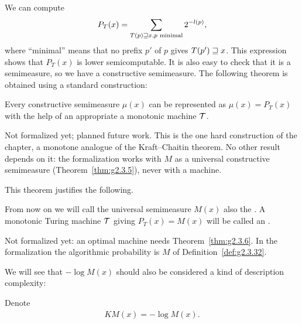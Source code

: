 We can compute
 \begin{align*}
  P_{T}(x)=\sum_{T(p) \sqsupseteq x, p\text{ minimal}} 2^{-l(p)},
 \end{align*}
where ``minimal'' means that no prefix \( p' \) of \( p \) gives \( T(p')\sqsupseteq x \).
This expression shows that \( P_{T}(x) \) is lower semicomputable.
It is also easy to check that it is a semimeasure, so we have a constructive
semimeasure.
The following theorem is obtained using a standard construction:

\begin{theorem}
  \label{thm:g2.3.6}
Every constructive semimeasure \( \mu(x) \) can be represented as
\( \mu(x)=P_{T}(x) \) with the help of an appropriate a monotonic machine \( \mathcal{T} \).
\end{theorem}

\begin{formalization}
Not formalized yet; planned future work. This is the one hard construction of the chapter, a
monotone analogue of the Kraft--Chaitin theorem. No other result depends on it: the
formalization works with \( M \) as a universal constructive semimeasure
(Theorem~\ref{thm:g2.3.5}), never with a machine.
\end{formalization}

This theorem justifies the following.

\begin{definition}
  \label{def:g2.3.35}
From now on we will call the universal semimeasure \( M(x) \) also
the .
A monotonic Turing machine \( \mathcal{T} \) giving \( P_{T}(x)=M(x) \) will be called an
.
\end{definition}

\begin{formalization}
Not formalized yet: an optimal machine needs Theorem~\ref{thm:g2.3.6}. In the formalization
the algorithmic probability is \( M \) of Definition~\ref{def:g2.3.32}.
\end{formalization}

We will see that \( -\log M(x) \) should also be considered a kind of
description complexity:

  \begin{definition}
  \label{def:g2.3.36}
  \leanok
Denote
 \begin{align*}
   KM(x) =-\log M(x).
 \end{align*}
  \end{definition}

